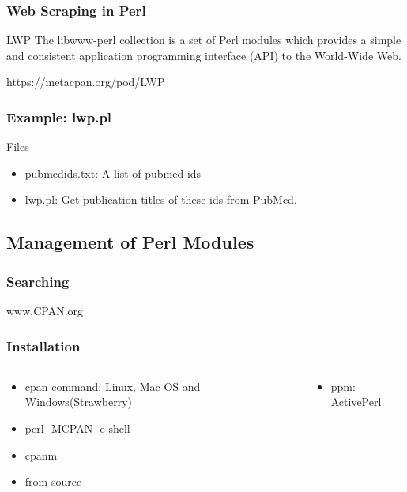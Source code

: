 \documentclass[UTF8]{beamer}
\begin{document}
\begin{frame}
  \frametitle{Web Scraping in Perl}
  \begin{block}{LWP}
    The libwww-perl collection is a set of Perl modules which provides a simple
    and consistent application programming interface (API) to the World-Wide Web.

    https://metacpan.org/pod/LWP
  \end{block}
\end{frame}

\begin{frame}
  \frametitle{Example: lwp.pl}
\begin{block}{Files}
  \begin{itemize}
    \item pubmedids.txt: A list of pubmed ids
    \item lwp.pl: Get publication titles of these ids from PubMed.
  \end{itemize}
\end{block}
\end{frame}

\subsection{Management of Perl Modules}

\begin{frame}
  \frametitle{Searching}
  \centerline{www.CPAN.org}
\end{frame}

\begin{frame}
  \frametitle{Installation}
\begin{columns}
  \begin{column}{.5\textwidth}
    \begin{itemize}
      \item cpan command: Linux, Mac OS and Windows(Strawberry)
      \item perl -MCPAN -e shell
      \item cpanm
      \item from source
    \end{itemize}
  \end{column}
  \begin{column}{.5\textwidth}
    \begin{itemize}
      \item ppm: ActivePerl
    \end{itemize}
  \end{column}
\end{columns}
\end{frame}
\end{document}
